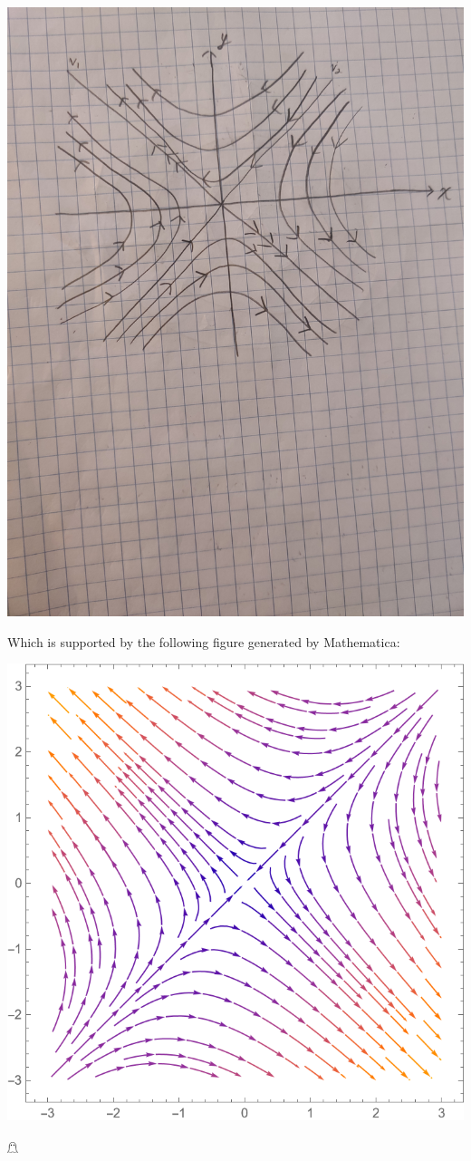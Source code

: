 \documentclass{article}
\begin{document}
\begin{itemize}
\begin{itemize}
        \begin{center}
            \includegraphics[scale = 0.05]{prob1a_sketch.jpg}
        \end{center}
        Which is supported by the following figure generated by Mathematica:
        \begin{center}
            \includegraphics[scale = 0.5]{prob1a_stream.png}
        \end{center}
        \hfill $\mathghost$


\end{itemize}
\end{itemize}
\end{document}
